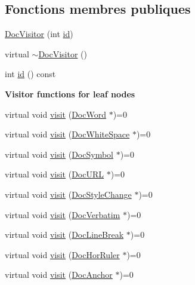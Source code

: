 \subsection*{Fonctions membres publiques}
\begin{DoxyCompactItemize}
\item 
\hyperlink{class_doc_visitor_a24962a0406b1d05920458f3d7d4fda8a}{Doc\+Visitor} (int \hyperlink{class_doc_visitor_a816cd6ab12305a4f34a06056fc923de1}{id})
\item 
virtual \hyperlink{class_doc_visitor_a11b3740103d21254806867da845a26aa}{$\sim$\+Doc\+Visitor} ()
\item 
int \hyperlink{class_doc_visitor_a816cd6ab12305a4f34a06056fc923de1}{id} () const 
\end{DoxyCompactItemize}
\begin{Indent}{\bf Visitor functions for leaf nodes}\par
\begin{DoxyCompactItemize}
\item 
virtual void \hyperlink{class_doc_visitor_aec59d1c93f82aad3569fb303f1e4d3f4}{visit} (\hyperlink{class_doc_word}{Doc\+Word} $\ast$)=0
\item 
virtual void \hyperlink{class_doc_visitor_a68f7be9249997380d4ee39f608b21e28}{visit} (\hyperlink{class_doc_white_space}{Doc\+White\+Space} $\ast$)=0
\item 
virtual void \hyperlink{class_doc_visitor_aff53bb2afd8f7dd963397eca8f53775d}{visit} (\hyperlink{class_doc_symbol}{Doc\+Symbol} $\ast$)=0
\item 
virtual void \hyperlink{class_doc_visitor_ad4b4715c1f30e5b7f2492f61f58eb41e}{visit} (\hyperlink{class_doc_u_r_l}{Doc\+U\+R\+L} $\ast$)=0
\item 
virtual void \hyperlink{class_doc_visitor_ae76aedd65bb04607b0b1475cc24720b1}{visit} (\hyperlink{class_doc_style_change}{Doc\+Style\+Change} $\ast$)=0
\item 
virtual void \hyperlink{class_doc_visitor_a1deb88f4f8320362379dfdb3259bcf5b}{visit} (\hyperlink{class_doc_verbatim}{Doc\+Verbatim} $\ast$)=0
\item 
virtual void \hyperlink{class_doc_visitor_a907478f5e152ccfcd898bbbfb86e8a62}{visit} (\hyperlink{class_doc_line_break}{Doc\+Line\+Break} $\ast$)=0
\item 
virtual void \hyperlink{class_doc_visitor_acb3e01375bf30212b9c9a320a338d998}{visit} (\hyperlink{class_doc_hor_ruler}{Doc\+Hor\+Ruler} $\ast$)=0
\item 
virtual void \hyperlink{class_doc_visitor_a6b50d6c801a96480fe5d696257204b5b}{visit} (\hyperlink{class_doc_anchor}{Doc\+Anchor} $\ast$)=0

\end{DoxyCompactItemize}
\end{Indent}
